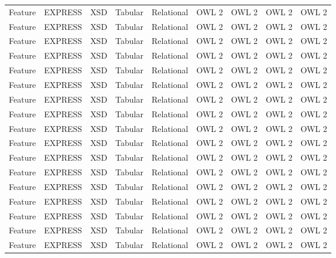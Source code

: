 \begin{table*}[t]
    \begin{tabularx}{\textwidth}{XXXXXXXXX}
        \hline
            Feature & EXPRESS   &   XSD &  Tabular  & Relational    &   OWL 2  & OWL 2 &    OWL 2   &   OWL 2 \\
            Feature & EXPRESS   &   XSD &  Tabular  & Relational    &   OWL 2  & OWL 2 &    OWL 2   &   OWL 2 \\
            Feature & EXPRESS   &   XSD &  Tabular  & Relational    &   OWL 2  & OWL 2 &    OWL 2   &   OWL 2 \\
            Feature & EXPRESS   &   XSD &  Tabular  & Relational    &   OWL 2  & OWL 2 &    OWL 2   &   OWL 2 \\
            Feature & EXPRESS   &   XSD &  Tabular  & Relational    &   OWL 2  & OWL 2 &    OWL 2   &   OWL 2 \\
            Feature & EXPRESS   &   XSD &  Tabular  & Relational    &   OWL 2  & OWL 2 &    OWL 2   &   OWL 2 \\
            Feature & EXPRESS   &   XSD &  Tabular  & Relational    &   OWL 2  & OWL 2 &    OWL 2   &   OWL 2 \\
            Feature & EXPRESS   &   XSD &  Tabular  & Relational    &   OWL 2  & OWL 2 &    OWL 2   &   OWL 2 \\
            Feature & EXPRESS   &   XSD &  Tabular  & Relational    &   OWL 2  & OWL 2 &    OWL 2   &   OWL 2 \\
            Feature & EXPRESS   &   XSD &  Tabular  & Relational    &   OWL 2  & OWL 2 &    OWL 2   &   OWL 2 \\
            Feature & EXPRESS   &   XSD &  Tabular  & Relational    &   OWL 2  & OWL 2 &    OWL 2   &   OWL 2 \\
            Feature & EXPRESS   &   XSD &  Tabular  & Relational    &   OWL 2  & OWL 2 &    OWL 2   &   OWL 2 \\
            Feature & EXPRESS   &   XSD &  Tabular  & Relational    &   OWL 2  & OWL 2 &    OWL 2   &   OWL 2 \\
            Feature & EXPRESS   &   XSD &  Tabular  & Relational    &   OWL 2  & OWL 2 &    OWL 2   &   OWL 2 \\
            Feature & EXPRESS   &   XSD &  Tabular  & Relational    &   OWL 2  & OWL 2 &    OWL 2   &   OWL 2 \\
            Feature & EXPRESS   &   XSD &  Tabular  & Relational    &   OWL 2  & OWL 2 &    OWL 2   &   OWL 2 \\
            Feature & EXPRESS   &   XSD &  Tabular  & Relational    &   OWL 2  & OWL 2 &    OWL 2   &   OWL 2 \\

\end{tabularx}
\end{table*}
